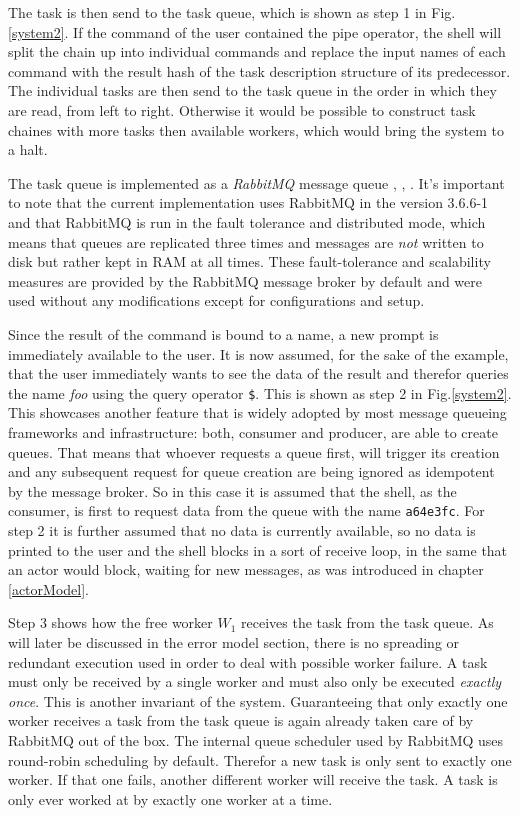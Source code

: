 The task is then send to the task queue, which is shown as step
1 in Fig.\ref{system2}. If the command of the user contained the
pipe operator, the shell will split the chain up into individual
commands and replace the input names of each command with the
result hash of the task description structure of its
predecessor. The individual tasks are then send to the task
queue in the order in which they are read, from left to right.
Otherwise it would be possible to construct task chaines with
more tasks then available workers, which would bring the system
to a halt.

The task queue is implemented
as a \textit{RabbitMQ} message queue \cite{rabbitmq},
\cite{rabbitmqwiki}, \cite{rabbitmqbook}. It's important to
note that the current implementation uses RabbitMQ in the
version 3.6.6-1 and that RabbitMQ is run in the fault tolerance
and distributed mode, which means that queues are replicated three
times and messages are \textit{not} written to disk but rather kept in
RAM at all times. These fault-tolerance and scalability measures
are provided by the RabbitMQ message broker by default and were
used without any modifications except for configurations and
setup.
\newline

Since the result of the command is bound to a name, a new
prompt is immediately available to the user. It is now assumed,
for the sake of the example, that the user immediately wants to
see the data of the result and therefor queries the name
\textit{foo} using the query operator \texttt{\$}. This is
shown as step 2 in Fig.\ref{system2}. This showcases another
feature that is widely adopted by most message queueing
frameworks and infrastructure: both, consumer and producer,
are able to create queues. That means that whoever requests
a queue first, will trigger its creation and any subsequent
request for queue creation are being ignored as idempotent
by the message broker. So in this case it is assumed that
the shell, as the consumer, is first to request data from the
queue with the name \texttt{a64e3fc}. For step 2 it is further
assumed that no data is currently available, so no data is
printed to the user and the shell blocks in a sort of
receive loop, in the same that an actor would block, waiting
for new messages, as was introduced in chapter \ref{actorModel}.
\newline

Step 3 shows how the free worker $W_{1}$ receives the task from
the task queue. As will later be discussed in the error model
section, there is no spreading or redundant execution used in
order to deal with possible worker failure. A task must only
be received by a single worker and must also only be executed
\textit{exactly once}. This is another invariant of the system.
Guaranteeing that only exactly one worker receives a task
from the task queue is again already taken care of by RabbitMQ out
of the box. The internal queue scheduler used by RabbitMQ
uses round-robin scheduling by default. Therefor a new task
is only sent to exactly one worker. If that one fails, another
different worker will receive the task. A task is only ever
worked at by exactly one worker at a time.

